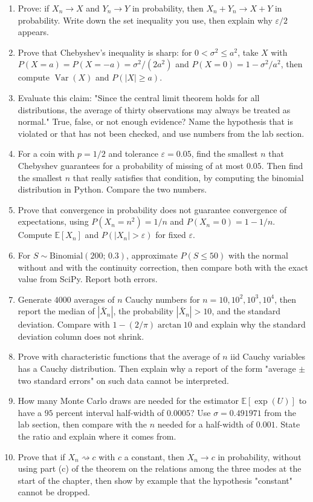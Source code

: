 \begin{latihan}
\begin{enumerate}
  \item Prove: if $X_n\to X$ and $Y_n\to Y$ in probability, then
        $X_n+Y_n\to X+Y$ in probability. Write down the set inequality you use, then
        explain why $\varepsilon/2$ appears.
  \item Prove that Chebyshev's inequality is sharp: for $0<\sigma^2\le a^2$, take $X$
        with $P(X=a)=P(X=-a)=\sigma^2/(2a^2)$ and
        $P(X=0)=1-\sigma^2/a^2$, then compute $\operatorname{Var}(X)$ and
        $P(|X|\ge a)$.
  \item Evaluate this claim: "Since the central limit theorem holds for all
        distributions, the average of thirty observations may always be treated as
        normal." True, false, or not enough evidence? Name the hypothesis that is
        violated or that has not been checked, and use numbers from the lab section.
  \item For a coin with $p=1/2$ and tolerance $\varepsilon=0.05$, find the smallest
        $n$ that Chebyshev guarantees for a probability of missing of at most
        $0.05$. Then find the smallest $n$ that really satisfies that condition, by
        computing the binomial distribution in Python. Compare the two numbers.
  \item Prove that convergence in probability does not guarantee convergence of
        expectations, using $P(X_n=n^2)=1/n$ and $P(X_n=0)=1-1/n$. Compute
        $\mathbb{E}[X_n]$ and $P(|X_n|>\varepsilon)$ for fixed $\varepsilon$.
  \item For $S\sim\text{Binomial}(200;\,0.3)$, approximate $P(S\le50)$ with the
        normal without and with the continuity correction, then compare both with the
        exact value from SciPy. Report both errors.
  \item Generate $4000$ averages of $n$ Cauchy numbers for
        $n=10,10^2,10^3,10^4$, then report the median of $|\bar X_n|$, the
        probability $|\bar X_n|>10$, and the standard deviation. Compare with
        $1-(2/\pi)\arctan10$ and explain why the standard deviation column does not
        shrink.
  \item Prove with characteristic functions that the average of $n$ iid Cauchy
        variables has a Cauchy distribution. Then explain why a report of the form
        "average $\pm$ two standard errors" on such data cannot be interpreted.
  \item How many Monte Carlo draws are needed for the estimator
        $\mathbb{E}[\exp(U)]$ to have a $95$ percent interval half-width of
        $0.0005$? Use $\sigma=0.491971$ from the lab section, then compare with
        the $n$ needed for a half-width of $0.001$. State the ratio and explain
        where it comes from.
  \item Prove that if $X_n\rightsquigarrow c$ with $c$ a constant, then
        $X_n\to c$ in probability, without using part (c) of the theorem on the
        relations among the three modes at the start of the chapter, then show by
        example that the hypothesis "constant" cannot be dropped.
\end{enumerate}


\end{latihan}

